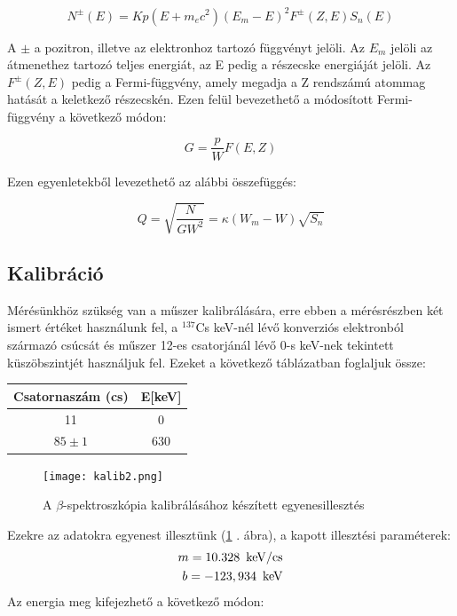 \documentclass[12pt,a4paper]{article}
\begin{document}
\begin{equation*}
N^{\pm}(E)= Kp(E+m_ec^2)(E_m-E)^2F^{\pm}(Z,E)S_n(E)
\end{equation*}

A $\pm$ a pozitron, illetve az elektronhoz tartozó függvényt jelöli. Az $E_m$ jelöli az átmenethez tartozó teljes energiát, az E pedig a részecske energiáját jelöli. Az $F^{\pm}(Z,E)$ pedig a Fermi-függvény, amely megadja a Z rendszámú atommag hatását a keletkező részecskén. Ezen felül bevezethető a módosított Fermi-függvény a következő módon: 

\begin{equation*}
G=\frac{p}{W}F(E,Z)
\end{equation*}

Ezen egyenletekből levezethető az alábbi összefüggés: 

\begin{equation*}
Q=\sqrt{\dfrac{N}{GW^2}}=\kappa (W_m-W)\sqrt{S_n}
\end{equation*}

\newpage

\subsection{Kalibráció}

Mérésünkhöz szükség van a műszer kalibrálására, erre ebben a mérésrészben két ismert értéket használunk fel, a $^{137}$Cs keV-nél lévő konverziós elektronból származó csúcsát és műszer 12-es csatorjánál lévő 0-s keV-nek tekintett küszöbszintjét használjuk fel. Ezeket a következő táblázatban foglaljuk össze: 

\begin{table}[h!]
\centering
\begin{tabular}{|c|c|}
\hline
Csatornaszám (cs) & E[keV] \\ \hline
11 & 0 \\ \hline
$85 \pm 1$ & 630 \\ \hline
\end{tabular}
\end{table}

\begin{figure}[!h]
\centering
\texttt{[image: kalib2.png]}
\caption{A $\beta$-spektroszkópia kalibrálásához készített egyenesillesztés}
\label{fig:12}
\end{figure}


Ezekre az adatokra egyenest illesztünk (\ref{fig:12} . ábra), a kapott illesztési paraméterek: 
\begin{equation*}
\begin{split}
m=10.328 \hspace*{5pt} \mathrm{keV/cs}\\ 
b =-123,934 \hspace*{5pt} \mathrm{keV}
\end{split}
\end{equation*}
Az energia meg kifejezhető a következő módon: 
\end{document}
